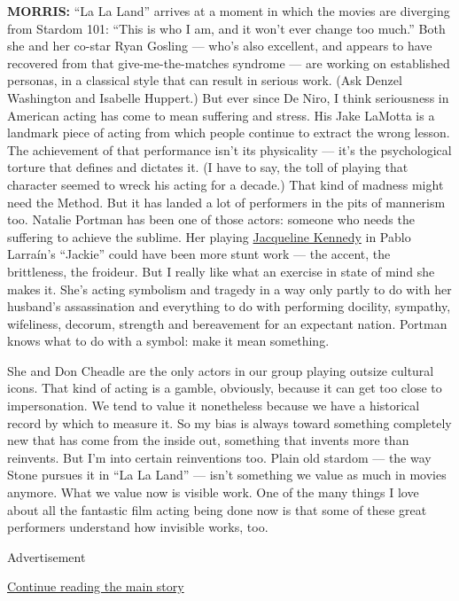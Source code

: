 \textbf{MORRIS:} ``La La Land'' arrives at a moment in which the movies
are diverging from Stardom 101: ``This is who I am, and it won't ever
change too much.'' Both she and her co-star Ryan Gosling --- who's also
excellent, and appears to have recovered from that give-me-the-matches
syndrome --- are working on established personas, in a classical style
that can result in serious work. (Ask Denzel Washington and Isabelle
Huppert.) But ever since De Niro, I think seriousness in American acting
has come to mean suffering and stress. His Jake LaMotta is a landmark
piece of acting from which people continue to extract the wrong lesson.
The achievement of that performance isn't its physicality --- it's the
psychological torture that defines and dictates it. (I have to say, the
toll of playing that character seemed to wreck his acting for a decade.)
That kind of madness might need the Method. But it has landed a lot of
performers in the pits of mannerism too. Natalie Portman has been one of
those actors: someone who needs the suffering to achieve the sublime.
Her playing
\href{https://www.nytimes3xbfgragh.onion/2016/11/30/fashion/jackie-kennedy-first-lady-natalie-portman.html}{Jacqueline
Kennedy} in Pablo Larraín's ``Jackie'' could have been more stunt work
--- the accent, the brittleness, the froideur. But I really like what an
exercise in state of mind she makes it. She's acting symbolism and
tragedy in a way only partly to do with her husband's assassination and
everything to do with performing docility, sympathy, wifeliness,
decorum, strength and bereavement for an expectant nation. Portman knows
what to do with a symbol: make it mean something.

She and Don Cheadle are the only actors in our group playing outsize
cultural icons. That kind of acting is a gamble, obviously, because it
can get too close to impersonation. We tend to value it nonetheless
because we have a historical record by which to measure it. So my bias
is always toward something completely new that has come from the inside
out, something that invents more than reinvents. But I'm into certain
reinventions too. Plain old stardom --- the way Stone pursues it in ``La
La Land'' --- isn't something we value as much in movies anymore. What
we value now is visible work. One of the many things I love about all
the fantastic film acting being done now is that some of these great
performers understand how invisible works, too.

Advertisement

\protect\hyperlink{after-bottom}{Continue reading the main story}

